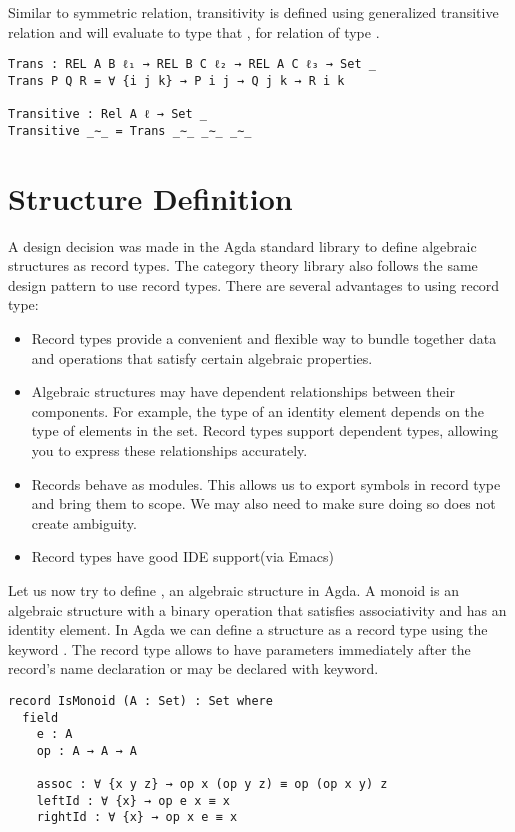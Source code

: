 Similar to symmetric relation, transitivity is defined using generalized
transitive relation and  will evaluate to type that ,  for relation  of type
.

\begin{verbatim}
Trans : REL A B ℓ₁ → REL B C ℓ₂ → REL A C ℓ₃ → Set _
Trans P Q R = ∀ {i j k} → P i j → Q j k → R i k

Transitive : Rel A ℓ → Set _
Transitive _∼_ = Trans _∼_ _∼_ _∼_
\end{verbatim}

\section{Structure Definition}
\label{structure}
A design decision was made in the Agda standard library to define algebraic
structures as record types. The category theory library \cite{hu2021formalizing}
also follows the same design pattern to use record types. There are several
advantages to using record type:
\begin{itemize}
  \item Record types provide a convenient and flexible way to bundle
  together data and operations that satisfy certain algebraic properties. 
  \item Algebraic structures may have dependent relationships between their
  components. For example, the type of an identity element depends on the type
  of elements in the set. Record types support dependent types,
  allowing you to express these relationships accurately.
  \item Records behave as modules. This allows us to export symbols in record
  type and bring them to scope. We may also need to make sure doing so does not
  create ambiguity.
  \item Record types have good IDE support(via Emacs)
\end{itemize}

Let us now try to define , an algebraic structure in Agda.
A monoid is an algebraic structure with a binary operation that satisfies
associativity and has an identity element. In Agda we can define a structure as
a record type using the keyword . The record type allows to have
parameters immediately after the record's name declaration or may be declared
with  keyword.

\begin{verbatim}
record IsMonoid (A : Set) : Set where
  field
    e : A           
    op : A → A → A  

    assoc : ∀ {x y z} → op x (op y z) ≡ op (op x y) z
    leftId : ∀ {x} → op e x ≡ x
    rightId : ∀ {x} → op x e ≡ x  
\end{verbatim}


